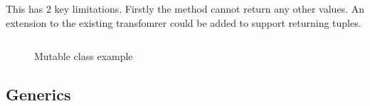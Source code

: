 \documentclass[ oneside,%
                    author={James Elgar},
                    degree={MEng},
                     title={Bidirectional transformer between functional and \\ object-oriented programming in Rust},
                  subtitle={}]{dissertation}
\newcommand{\codefile}[2]{\inputminted[xleftmargin=20pt,linenos, breaklines]{#1}{#2}}
\newcommand{\rustfile}[1]{\codefile{rust}{../#1.rs}}
\newcommand{\rustexample}[1]{\rustfile{examples/src/#1}}
\begin{document}
This has 2 key limitations. Firstly the method cannot return any other values. An extension to the existing transfomrer could be added to support returning tuples.



\begin{figure}
\centering
\rustexample{mutable/oop-basic}
\caption{Mutable class example}
\label{fig:mutable-example}
\end{figure}


\subsection{Generics}





\end{document}
